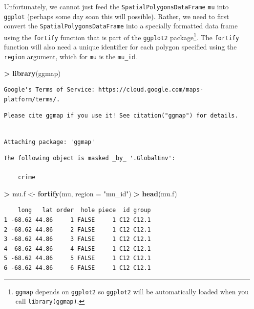 \documentclass[]{krantz}
\makeatletter
\newenvironment{Shaded}{\begin{snugshade}}{\end{snugshade}}
\newcommand{\DataTypeTok}[1]{\textcolor[rgb]{0.27,0.27,0.27}{#1}}
\newcommand{\KeywordTok}[1]{\textcolor[rgb]{0.27,0.27,0.27}{\textbf{#1}}}
\newcommand{\NormalTok}[1]{#1}
\newcommand{\OperatorTok}[1]{\textcolor[rgb]{0.43,0.43,0.43}{\textbf{#1}}}
\newcommand{\StringTok}[1]{\textcolor[rgb]{0.5,0.5,0.5}{#1}}
\newenvironment{kframe}{%
\medskip{}
\setlength{\fboxsep}{.8em}
 \def\at@end@of@kframe{}%
 \ifinner\ifhmode%
  \def\at@end@of@kframe{\end{minipage}}%
  \begin{minipage}{\columnwidth}%
 \fi\fi%
 \def\FrameCommand##1{\hskip\@totalleftmargin \hskip-\fboxsep
 \colorbox{shadecolor}{##1}\hskip-\fboxsep
     \hskip-\linewidth \hskip-\@totalleftmargin \hskip\columnwidth}%
 \MakeFramed {\advance\hsize-\width
   \@totalleftmargin\z@ \linewidth\hsize
   \@setminipage}}%
 {\par\unskip\endMakeFramed%
 \at@end@of@kframe}
\renewenvironment{Shaded}{\begin{kframe}}{\end{kframe}}
\makeatother
\begin{document}
Unfortunately, we cannot just feed the \texttt{SpatialPolygonsDataFrame} \texttt{mu} into \texttt{ggplot} (perhaps some day soon this will possible). Rather, we need to first convert the \texttt{SpatialPolygonsDataFrame} into a specially formatted data frame using the \texttt{fortify} function that is part of the \texttt{ggplot2} package\footnote{\texttt{ggmap} depends on \texttt{ggplot2} so \texttt{ggplot2} will be automatically loaded when you call \texttt{library(ggmap)}.}. The \texttt{fortify} function will also need a unique identifier for each polygon specified using the \texttt{region} argument, which for \texttt{mu} is the \texttt{mu\_id}.

\begin{Shaded}
\begin{Highlighting}[]
\OperatorTok{>}\StringTok{ }\KeywordTok{library}\NormalTok{(ggmap)}
\end{Highlighting}
\end{Shaded}

\begin{verbatim}
Google's Terms of Service: https://cloud.google.com/maps-platform/terms/.
\end{verbatim}

\begin{verbatim}
Please cite ggmap if you use it! See citation("ggmap") for details.
\end{verbatim}

\begin{verbatim}

Attaching package: 'ggmap'
\end{verbatim}

\begin{verbatim}
The following object is masked _by_ '.GlobalEnv':

    crime
\end{verbatim}

\begin{Shaded}
\begin{Highlighting}[]
\OperatorTok{>}\StringTok{ }\NormalTok{mu.f <-}\StringTok{ }\KeywordTok{fortify}\NormalTok{(mu, }\DataTypeTok{region =} \StringTok{"mu_id"}\NormalTok{)}
\OperatorTok{>}\StringTok{ }\KeywordTok{head}\NormalTok{(mu.f)}
\end{Highlighting}
\end{Shaded}

\begin{verbatim}
    long   lat order  hole piece  id group
1 -68.62 44.86     1 FALSE     1 C12 C12.1
2 -68.62 44.86     2 FALSE     1 C12 C12.1
3 -68.62 44.86     3 FALSE     1 C12 C12.1
4 -68.62 44.86     4 FALSE     1 C12 C12.1
5 -68.62 44.86     5 FALSE     1 C12 C12.1
6 -68.62 44.86     6 FALSE     1 C12 C12.1
\end{verbatim}
\end{document}

